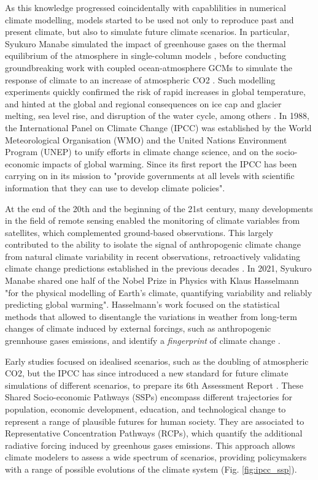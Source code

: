 As this knowledge progressed coincidentally with capablilities in numerical climate modelling, models started to be used not only to reproduce past and present climate, but also to simulate future climate scenarios. 
In particular, Syukuro Manabe simulated the impact of greenhouse gases on the thermal equilibrium of the atmosphere in single-column models \citep{manabe_thermal_1964}
, before conducting groundbreaking work with coupled ocean-atmosphere GCMs to simulate the response of climate to an increase of atmospheric CO2 \citep{manabe_sensitivity_1980}. 
Such modelling experiments quickly confirmed the risk of rapid increases in global temperature, and hinted at the global and regional consequences on ice cap and glacier melting, sea level rise, and disruption of the water cycle, among others \citep{hansen_global_1988}. 
In 1988, the International Panel on Climate Change (IPCC) was established by the World Meteorological Organisation (WMO) and the United Nations Environment Program (UNEP) to unify efforts in climate change science, and on the socio-economic impacts of global warming. Since its first report \citep{IPCC_1990_AR1_WG1} the IPCC has been carrying on in its mission to "provide governments at all levels with scientific information that they can use to develop climate policies".

At the end of the 20th and the beginning of the 21st century, many developments in the field of remote sensing enabled the monitoring of climate variables from satellites, which complemented ground-based observations. This largely contributed to the ability to isolate the signal of anthropogenic climate change from natural climate variability in recent observations, retroactively validating climate change predictions established in the previous decades \citep{hansen_earths_2005,yang_role_2013}. 
In 2021, Syukuro Manabe shared one half of the Nobel Prize in Physics with Klaus Hasselmann "for the physical modelling of Earth's climate, quantifying variability and reliably predicting global warming". 
Hasselmann's work focused on the statistical methods that allowed to disentangle the variations in weather from long-term changes of climate induced by external forcings, such as anthropogenic grennhouse gases emissions, and identify a \textit{fingerprint} of climate change \citep{hasselmann_optimal_1993,hasselmann_stochastic_2022}.

Early studies focused on idealised scenarios, such as the doubling of atmospheric CO2, but the IPCC has since introduced a new standard for future climate simulations of different scenarios, to prepare its 6th Assessment Report \citep{RN1}. These Shared Socio-economic Pathways (SSPs) encompass different trajectories for population, economic development, education, and technological change to represent a range of plausible futures for human society. They are associated to Representative Concentration Pathways (RCPs), which quantify the additional radiative forcing induced by greenhous gases emissions.
This approach allows climate modelers to assess a wide spectrum of scenarios, providing policymakers with a range of possible evolutions of the climate system (Fig. \ref{fig:ipcc_ssp}).

